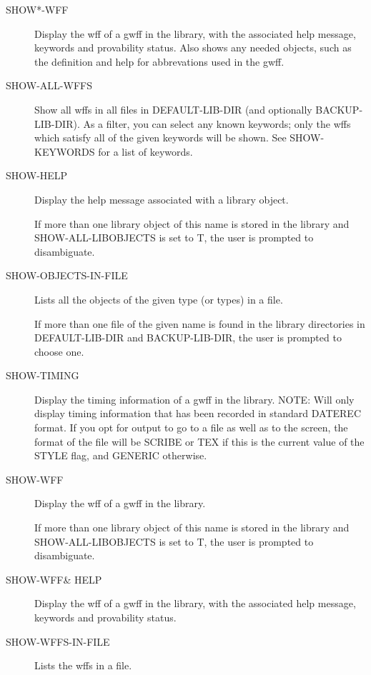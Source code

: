 \begin{description}
\item[SHOW*-WFF]  
Display the wff of a gwff in the library, with the associated
help message, keywords and provability status.
Also shows any needed objects, such as the definition and
help for abbrevations used in the gwff.

\item[SHOW-ALL-WFFS]  
Show all wffs in all files in DEFAULT-LIB-DIR (and optionally BACKUP-LIB-DIR).
As a filter, you can select any known keywords; only the wffs which 
satisfy all of the given keywords will be shown. See SHOW-KEYWORDS 
for a list of keywords.

\item[SHOW-HELP]  
Display the help message associated with a library object.

If more than one library object of this name is stored in
the library and SHOW-ALL-LIBOBJECTS is set to T,
the user is prompted to disambiguate.

\item[SHOW-OBJECTS-IN-FILE]  
Lists all the objects of the given type (or types) in a file.

If more than one file of the given name is found in the library directories
in DEFAULT-LIB-DIR and BACKUP-LIB-DIR, the user is prompted to choose one.

\item[SHOW-TIMING]  
Display the timing information of a gwff in the library.
NOTE: Will only display timing information that has been recorded 
in standard DATEREC format.
If you opt for output to go to a file as well as to the screen, 
the format of the file will be SCRIBE or TEX if this is the current
value of the STYLE flag, and GENERIC otherwise.

\item[SHOW-WFF]  
Display the wff of a gwff in the library.

If more than one library object of this name is stored in
the library and SHOW-ALL-LIBOBJECTS is set to T,
the user is prompted to disambiguate.

\item[SHOW-WFF\& HELP]  
Display the wff of a gwff in the library, with the associated
help message, keywords and provability status.

\item[SHOW-WFFS-IN-FILE]  
Lists the wffs in a file.


\end{description}
